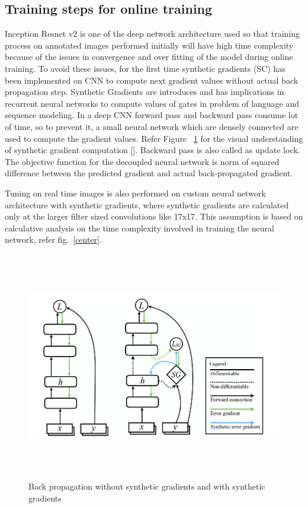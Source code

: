 \documentclass[a4paper,12pt, twoside]{NITKReport}
\begin{document}
\subsection{Training steps for online training}
\par Inception Resnet v2 is one of the deep network architecture used so that training process on annotated images performed initially will have high time complexity because of the issues in convergence and over fitting of the model during online training. To avoid these issues, for the first time synthetic gradients (SC) has been implemented on CNN to compute next gradient values without actual back propagation step. Synthetic Gradients are introduces and has implications in recurrent neural networks to compute values of gates in problem of language and sequence modeling.  In a deep CNN forward pass and backward pass consume lot of time, so to prevent it, a small neural network which are densely connected are used to compute the gradient values. Refer Figure ~\ref{synthetic_grad} for the visual understanding of synthetic gradient computation [\cite{DBLP:journals/corr/JaderbergCOVGK16}]. Backward pass is also called as update lock. The objective function for the decoupled neural network is norm of squared difference between the predicted gradient and actual back-propagated gradient.

\par Tuning on real time images is also performed on custom neural network architecture with synthetic gradients, where synthetic gradients are calculated only at the larger filter sized convolutions like 17x17. This assumption is based on calculative analysis on the time complexity involved in training the neural network, refer fig.~\ref{center}. 


 
\begin{figure} [h]
\centering
    \includegraphics[height=10cm,width=14cm]{Selection_039.png}
    \caption{Back propagation without synthetic gradients and with synthetic gradients}
    \label{synthetic_grad}
\end{figure}
\end{document}
